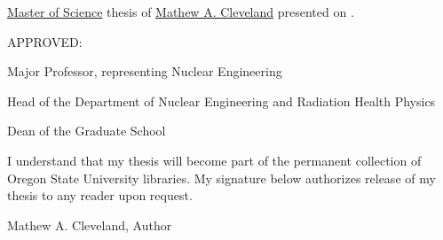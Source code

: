 
\thispagestyle{empty}

\noindent \underline{Master of Science} thesis of
	  \underline{Mathew A. Cleveland} presented on
	  \underline{\myDefenseDate}.

\vspace{0.5in}

\noindent APPROVED:

\vspace{1.0in}

\noindent \hrulefill 

\noindent Major Professor, representing Nuclear Engineering

\vspace{1.0in}

\noindent \hrulefill

\noindent Head of the Department of Nuclear Engineering and Radiation Health Physics

\vspace{1.0in}

\noindent \hrulefill

\noindent Dean of the Graduate School

\vspace{1.0in}

\noindent I understand that my thesis will become part of the
	  permanent collection of Oregon State University
	  libraries.  My signature below authorizes release 
	  of my thesis to any reader upon request.

\vspace{0.9in}

\noindent \hrulefill 

\begin{center}
   Mathew A. Cleveland, Author
\end{center}

